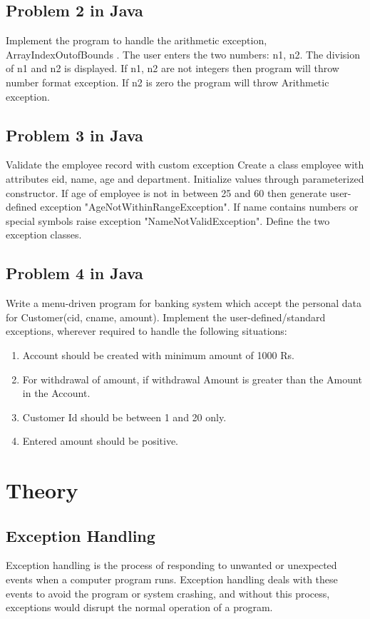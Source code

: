 \documentclass[11pt]{article}
\begin{document}
\subsection{Problem 2 in Java}
Implement the program to handle the arithmetic exception, ArrayIndexOutofBounds .
The user enters the two numbers: n1, n2. The division of n1 and n2 is displayed. If n1, n2
are not integers then program will throw number format exception. If n2 is zero the
program will throw Arithmetic exception.

\subsection{Problem 3 in Java}
Validate the employee record with custom exception
Create a class employee with attributes eid, name, age and department.
Initialize values through parameterized constructor. If age of employee is not in between
25 and 60 then generate user-defined exception "AgeNotWithinRangeException". If
name contains numbers or special symbols raise exception "NameNotValidException".
Define the two exception classes.

\subsection{Problem 4 in Java}
Write a menu-driven program for banking system which accept the personal data for
Customer(cid, cname, amount).
Implement the user-defined/standard exceptions, wherever required to handle the
following situations:

\begin{enumerate}
	\item Account should be created with minimum amount of 1000 Rs.
	\item For withdrawal of amount, if withdrawal Amount is greater than the Amount in the Account.
	\item Customer Id should be between 1 and 20 only.
	\item Entered amount should be positive.
\end{enumerate}
\section{Theory}
\subsection{Exception Handling}
Exception handling is the process of responding to unwanted or unexpected events when a computer program runs. Exception handling deals with these events to avoid the program or system crashing, and without this process, exceptions would disrupt the normal operation of a program.\\
\end{document}
